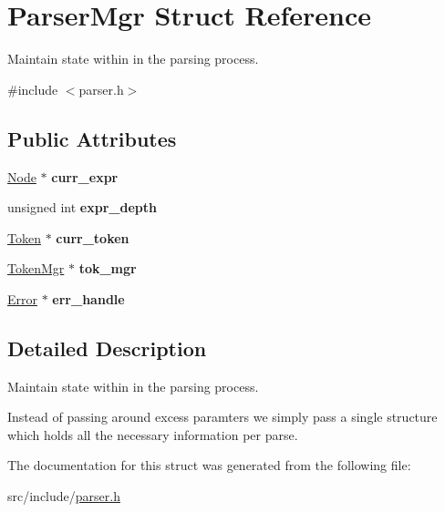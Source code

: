 \hypertarget{struct_parser_mgr}{}\section{Parser\+Mgr Struct Reference}
\label{struct_parser_mgr}


Maintain state within in the parsing process.  




{\ttfamily \#include $<$parser.\+h$>$}

\subsection*{Public Attributes}
\begin{DoxyCompactItemize}
\item 
\mbox{\label{struct_parser_mgr_a50b337b2185017f943a7ce0a7dc7e8f9}} 
\mbox{\hyperlink{struct_node}{Node}} $\ast$ {\bfseries curr\+\_\+expr}
\item 
\mbox{\label{struct_parser_mgr_ac10dc0846d693c106a2620b2906ed729}} 
unsigned int {\bfseries expr\+\_\+depth}
\item 
\mbox{\label{struct_parser_mgr_a2f91e648f300891d40e0fb2b903789c0}} 
\mbox{\hyperlink{struct_token}{Token}} $\ast$ {\bfseries curr\+\_\+token}
\item 
\mbox{\label{struct_parser_mgr_a2f758482ba8935ae5709f66d4295d320}} 
\mbox{\hyperlink{struct_token_mgr}{Token\+Mgr}} $\ast$ {\bfseries tok\+\_\+mgr}
\item 
\mbox{\label{struct_parser_mgr_a35287ee719c8ac8f666cc8ebc2ac7003}} 
\mbox{\hyperlink{struct_error}{Error}} $\ast$ {\bfseries err\+\_\+handle}
\end{DoxyCompactItemize}


\subsection{Detailed Description}
Maintain state within in the parsing process. 

Instead of passing around excess paramters we simply pass a single structure which holds all the necessary information per parse. 

The documentation for this struct was generated from the following file\+:\begin{DoxyCompactItemize}
\item 
src/include/\mbox{\hyperlink{parser_8h}{parser.\+h}}\end{DoxyCompactItemize}
